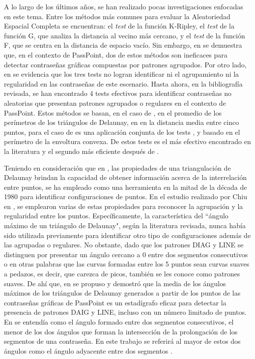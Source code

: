 \documentclass[12pt]{report}
\begin{document}
	A lo largo de los últimos años, se han realizado pocas investigaciones enfocadas en este tema. Entre los métodos más comunes para evaluar la Aleatoriedad Espacial Completa se encuentran: el \textit{test} de la función K-Ripley, el \textit{test} de la función G, que analiza la distancia al vecino más cercano, y el \textit{test} de la función F, que se centra en la distancia de espacio vacío. Sin embargo, en \cite{6,7} se demuestra que, en el contexto de PassPoint, dos de estos métodos son ineficaces para detectar contraseñas gráficas compuestas por patrones agrupados. Por otro lado, en \cite{7,8} se evidencia que los tres tests no logran identificar ni el agrupamiento ni la regularidad en las contraseñas de este escenario. Hasta ahora, en la bibliografía revisada, se han encontrado 4 tests efectivos \cite{7,9,10,11} para identificar contraseñas no aleatorias que presentan patrones agrupados o regulares en el contexto de PassPoint. Estos métodos se basan, en el caso de \cite{9}, en el promedio de los perímetros de los triángulos de Delaunay, en  \cite{7} en la distancia media entre cinco puntos, para el caso de \cite{10} es una aplicación conjunta de los tests \cite{7,9}, y \cite{11} basado en  el perímetro de la envoltura convexa. De estos tests \cite{11} es el más efectivo encontrado en la literatura y el segundo más eficiente después de \cite{7}.
	
	Teniendo en consideración que en \cite{12}, las propiedades de una triangulación de Delaunay brindan la capacidad de obtener información acerca de la interrelación entre puntos, se ha empleado como una herramienta en la mitad de la década de 1980 para identificar configuraciones de puntos. En el estudio realizado por Chiu en \cite{12}, se emplearon varias de estas propiedades para reconocer la agrupación y la regularidad entre los puntos. Específicamente, la característica del ``ángulo máximo de un triángulo de Delaunay", según la literatura revisada, nunca había sido utilizada previamente para identificar otro tipo de configuraciones además de las agrupadas o regulares. No obstante, dado que los patrones DIAG y LINE se distinguen por presentar un ángulo cercano a 0{\degree } entre dos segmentos consecutivos o en otras palabras que las curvas formadas entre los 5 puntos sean curvas suaves a pedazos, es decir, que carezca de picos, también se les conoce como patrones suaves.  De ahí que, en \cite{13} se propuso y demostró que la media de los ángulos máximos de los triángulos de Delaunay generados a partir de los puntos de las contraseñas gráficas de PassPoint es un estadígrafo eficaz para detectar la presencia de patrones DAIG y LINE, incluso con un número limitado de puntos. En \cite{5} se entendía como el ángulo formado entre dos segmentos consecutivos, el menor de los dos ángulos que forman la intersección de la prolongación de los segmentos de una contraseña. En este trabajo se referirá al mayor de estos dos ángulos como el ángulo adyacente entre dos segmentos .
\end{document}
